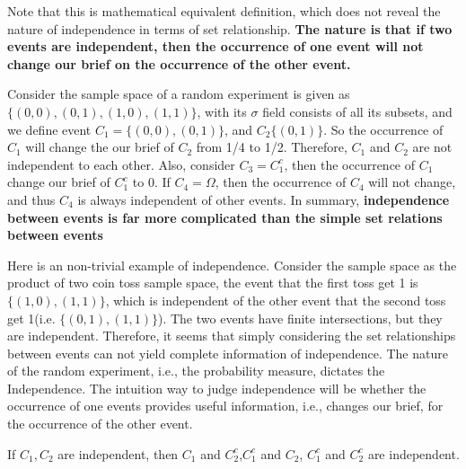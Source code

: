 \begin{refsection}
\begin{remark}
	Note that this is mathematical equivalent definition, which does not reveal the nature of independence in terms of set relationship. \textbf{The nature is that if two events are independent, then the occurrence of one event will not change our brief on the occurrence of the other event.}
\end{remark}

\begin{example}
	Consider the sample space of a random experiment is given as $\{(0,0),(0,1),(1,0),(1,1)\}$, with its $\sigma$ field consists of all its subsets, and we define event $C_1=\{(0,0),(0,1)\}$, and $C_2\{(0,1)\}$. So the occurrence of $C_1$ will change the our brief of $C_2$ from 1/4 to 1/2. Therefore, $C_1$ and $C_2$ are not independent to each other.  Also, consider $C_3 = C_1^c$, then the occurrence of $C_1$ change our brief of $C_1^c$ to 0. If $C_4 = \Omega$, then the occurrence of $C_4$ will not change, and thus $C_4$ is always independent of other events. In summary, \textbf{independence between events is far more complicated than the simple set relations between events} 	
\end{example}

\begin{remark}
	Here is an non-trivial example of independence. Consider the sample space as the product of two coin toss sample space, the event that the first toss get 1 is $\{(1,0),(1,1)\}$, which is independent of the other event that the second toss get 1(i.e. $\{(0,1),(1,1)\}$). The two events have finite intersections, but they are independent. Therefore, it seems that simply considering the set relationships between events can not yield complete information of independence. The nature of the random experiment, i.e., the probability measure, dictates the Independence. The intuition way to judge independence will be whether the occurrence of one events provides useful information, i.e., changes our brief, for the occurrence of the other event.	
\end{remark}


\begin{lemma}
	If $C_1,C_2$ are independent, then $C_1$ and $C_2^c$,$C_1^c$ and $C_2$, $C_1^c$ and $C_2^c$ are independent. 	
\end{lemma}


\end{refsection}
